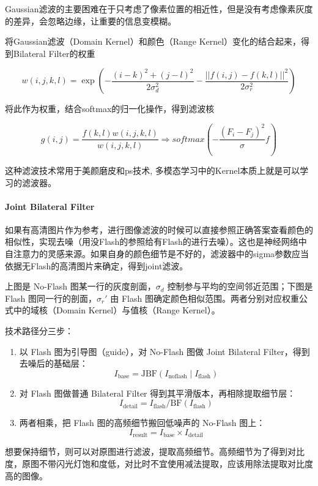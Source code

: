Gaussian滤波的主要困难在于只考虑了像素位置的相近性，但是没有考虑像素灰度的差异，会忽略边缘，让重要的信息变模糊。

将Gaussian滤波（Domain Kernel）和颜色（Range Kernel）变化的结合起来，得到Bilateral Filter的权重

\[
w (i,j,k,l) = \exp(-\frac{(i-k)^2+(j-l)^2}{2\sigma_{d}^{2}}-\frac{||f(i,j) - f(k,l)||^2}{2\sigma_{r}^{2}})
\]

将此作为权重，结合softmax的归一化操作，得到滤波核

\[
g(i,j) = \frac{f(k,l)w(i,j,k,l)}{w(i,j,k,l)} \Rightarrow softmax(-\frac{(F_i-F_j)^2}{\sigma}f)
\]

这种滤波技术常用于美颜磨皮和ps技术, 多模态学习中的Kernel本质上就是可以学习的滤波器。

\paragraph{Joint Bilateral Filter}

如果有高清图片作为参考，进行图像滤波的时候可以直接参照正确答案查看颜色的相似性，实现去噪（用没Flash的参照给有Flash的进行去噪）。这也是神经网络中自注意力的灵感来源。如果自身的颜色细节是不好的，滤波器中的sigma参数应当依据无Flash的高清图片来确定，得到joint滤波。

上图是 No-Flash 图某一行的灰度剖面，$\sigma_d$ 控制参与平均的空间邻近范围；下图是 Flash 图同一行的剖面，$\sigma_r'$ 由 Flash 图确定颜色相似范围。两者分别对应权重公式中的域核（Domain Kernel）与值核（Range Kernel）。

技术路径分三步：

\begin{enumerate}[label=\arabic*.]
    \item 以 Flash 图为引导图（guide），对 No-Flash 图做 Joint Bilateral Filter，得到去噪后的基础层：
    \[
    I_{\mathrm{base}} = \mathrm{JBF}(I_{\mathrm{noflash}} \mid I_{\mathrm{flash}})
    \]
    \item 对 Flash 图做普通 Bilateral Filter 得到其平滑版本，再相除提取细节层：
    \[
    I_{\mathrm{detail}} = I_{\mathrm{flash}} / \mathrm{BF}(I_{\mathrm{flash}})
    \]
    \item 两者相乘，把 Flash 图的高频细节搬回低噪声的 No-Flash 图上：
    \[
    I_{\mathrm{result}} = I_{\mathrm{base}} \times I_{\mathrm{detail}}
    \]
\end{enumerate}

想要保持细节，则可以对原图进行滤波，提取高频细节。高频细节为了得到对比度，原图不带闪光灯饱和度低，对比时不宜使用减法提取，应该用除法提取对比度高的图像。

